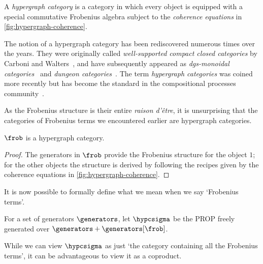 \begin{definition}
    \label{def:hypergraph-category}
    A \emph{hypergraph category} is a category in which every object is equipped
    with a special commutative Frobenius algebra subject to the
    \emph{coherence equations} in \cref{fig:hypergraph-coherence}.
\end{definition}
%
%
%
\begin{remark}
    The notion of a hypergraph category has been
    rediscovered numerous times over the years.
    They were originally called \emph{well-supported compact closed categories}
    by Carboni and Walters~\cite{carboni1987cartesian}, and have subsequently
    appeared as
    \emph{dgs-monoidal categories}~\cite{katis1997bicategories,gadducci1998inductive,gadducci1999bicategorical,bruni2002normal}
    and \emph{dungeon categories}~\cite{morton2014belief}.
    The term \emph{hypergraph categories} was coined more recently but has
    become the standard in the compositional processes
    community~\cite{kissinger2015finite,fong2015decorated,baez2016compositional,baez2018compositional}.
\end{remark}

As the Frobenius structure is their entire \emph{raison d'\^{e}tre}, it is
unsurprising that the categories of Frobenius terms we encountered earlier are
hypergraph categories.

\begin{lemma}\label{lem:frob-hypergraph}
    \(\frob\) is a hypergraph category.
\end{lemma}
\begin{proof}
    The generators in \(\frob\) provide the Frobenius structure for the object
    \(1\); for the other objects the structure is derived by following the
    recipes given by the coherence equations in \cref{fig:hypergraph-coherence}.
\end{proof}

It is now possible to formally define what we mean when we say `Frobenius
terms'.

\begin{definition}
    For a set of generators \(\generators\), let \(\hypcsigma\) be the PROP
    freely generated over \(\generators + \generators[\frob]\).
\end{definition}

While we can view \(\hypcsigma\) as just `the category containing all the
Frobenius terms', it can be advantageous to view it as a coproduct.


